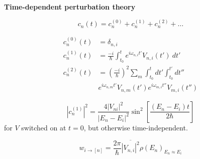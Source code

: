 {\bf Time-dependent perturbation theory}

\begin{equation}
c_n(t) = c_n^{(0)} + c_n^{(1)} + c_n^{(2)} + \dots
\end{equation}

\begin{align}
c_n^{(0)}(t) & = \delta_{n,i} \\
c_n^{(1)}(t) & = \frac{-i}{\hbar}
  \int_{t_0}^t e^{i\omega_{n,i}t'} V_{n,i}(t') \: dt' \\
c_n^{(2)}(t) & = \left( \frac{-i}{\hbar} \right)^2
\sum_m \int_{t_0}^{t} dt' \int_{t_0}^{t'} dt''  \nonumber \\
&
e^{i\omega_{n,m}t'} V_{n,m}(t') e^{i\omega_{m,i}t''} V_{m,i}(t'')
\end{align}


\begin{equation}
|c_n^{(1)}|^2 =
  \frac{4|V_{ni}|^2}{|E_n-E_i|^2} \sin^2
    \left [
      \frac{(E_n-E_i)t}{2\hbar}
    \right ]
\end{equation}
{\footnotesize for $V$ switched on at $t=0$, but otherwise time-independent.}

\begin{equation}
w_{i\rightarrow [n]} =
\frac{2\pi}{\hbar} \overline{|V_{n,i}|^2} \rho(E_n)_{E_n \approx E_i}
\end{equation}
